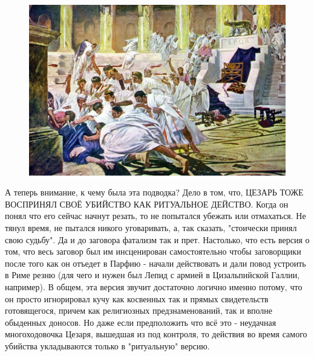 \begin{figure}[h!tb] 
	\centering\includegraphics[scale=0.4]{ReligionRomeCaesar/159574567611657516.png}
\end{figure}

А теперь внимание, к чему была эта подводка? Дело в том, что, ЦЕЗАРЬ ТОЖЕ ВОСПРИНЯЛ СВОЁ УБИЙСТВО КАК РИТУАЛЬНОЕ ДЕЙСТВО. Когда он понял что его сейчас начнут резать, то не попытался убежать или отмахаться. Не тянул время, не пытался никого уговаривать, а, так сказать, "стоически принял свою судьбу". Да и до заговора фатализм так и прет. Настолько, что есть версия о том, что весь заговор был им инсценирован самостоятельно чтобы заговорщики после того как он отъедет в Парфию - начали действовать и дали повод устроить в Риме резню (для чего и нужен был Лепид с армией в Цизальпийской Галлии, например). В общем, эта версия звучит достаточно логично именно потому, что он просто игнорировал кучу как косвенных так и прямых свидетельств готовящегося, причем как религиозных предзнаменований, так и вполне обыденных доносов. Но даже если предположить что всё это - неудачная многоходовочка Цезаря, вышедшая из под контроля, то действия во время самого убийства укладываются только в "ритуальную" версию.


